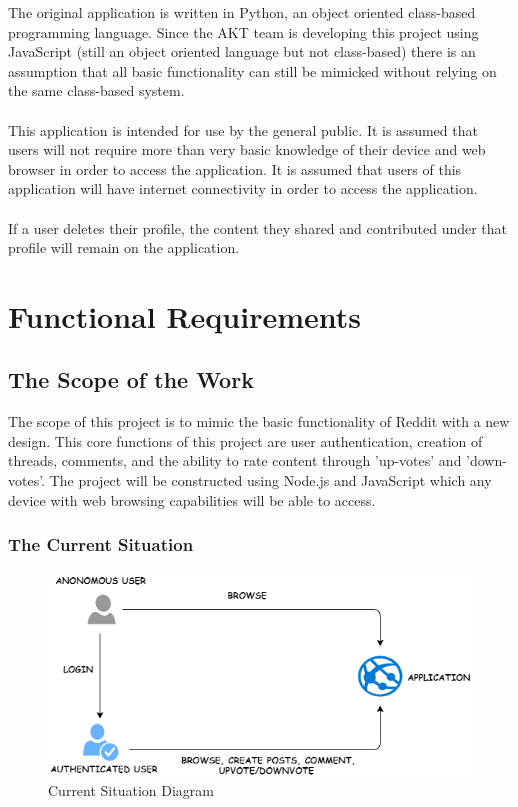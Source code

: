 \documentclass[12pt,fleqn]{article}
\begin{document}
The original application is written in Python, an object oriented class-based programming language.  Since the AKT team is developing this project using JavaScript (still an object oriented language but not class-based) there is an assumption that all basic functionality can still be mimicked without relying on the same class-based system. \\ \\
This application is intended for use by the general public.  It is assumed that users will not require more than very basic knowledge of their device and web browser in order to access the application.  It is assumed that users of this application will have internet connectivity in order to access the application.\\ \\ 
If a user deletes their profile, the content they shared and contributed under that profile will remain on the application.

\pagebreak


\section {Functional Requirements}

\subsection {The Scope of the Work}
The scope of this project is to mimic the basic functionality of Reddit with a new design. This core functions of this project are user authentication, creation of threads, comments, and the ability to rate content through ’up-votes’ and ’down-votes’. The project will be constructed using Node.js and JavaScript which any device with web browsing capabilities will be able to access.

\subsubsection{The Current Situation}

\begin{figure}[htp]
\centering
\includegraphics[width=19cm]{situation}
\caption{Current Situation Diagram}
\label{fig:env}
\end{figure}
\end{document}
